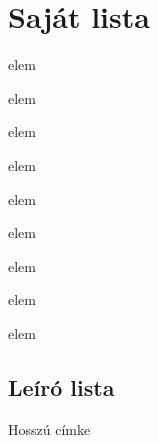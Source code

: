 \documentclass[12pt]{article}
\begin{document}
\section{Saját lista}
\setcounter{mycounter}{1}
\begin{myenum}
\item[\label=(\themycounter)] elem
\item[\label=(\$)] elem
\item[\label=(\themycounter)] elem
\begin{myenum}
\item elem
\begin{myenum}
\item elem
\begin{myenum}
\item elem
\begin{myenum}
\item elem
\end{myenum}
\end{myenum}
\end{myenum}
\end{myenum}
\end{myenum}
\hulipsum[2]
\begin{myenum}
\item[\label=(\themycounter)] elem
\item[\label=(\themycounter)] elem
\end{myenum}
\newpage
\subsection{Leíró lista}
\begin{description}[style=nextline]
\item[] \hulipsum[1]
\item[Slanted] \hulipsum[2]
\begin{description}
\item[Hosszú címke] \hulipsum[2]
\end{description}
\end{description}
\end{document}
